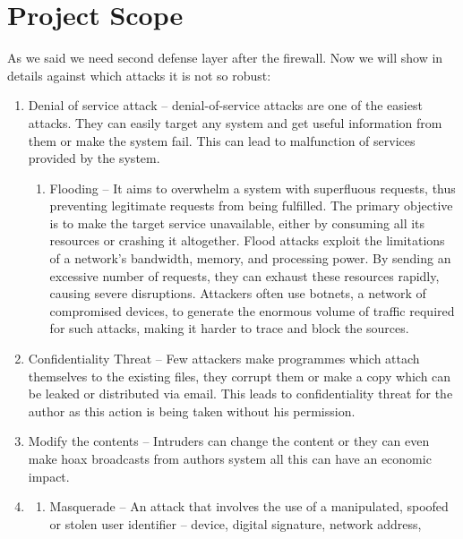\documentclass[oneside, english]{reports/assets/sdqtechreport}
\begin{document}
\chapter{Project Scope}
\label{chap:ProjectScope}

As we said we need second defense layer after the firewall. Now we will show in
details against which attacks it is not so robust:

\begin{enumerate}
	\item Denial of service attack – denial-of-service attacks are one of the easiest
	      attacks. They can easily target any system and get useful information from them
	      or make the system fail. This can lead to malfunction of services provided by
	      the system.
	      \begin{enumerate}
		      \item Flooding – It aims to overwhelm a system with superfluous requests, thus
		            preventing legitimate requests from being fulfilled. The primary objective is
		            to make the target service unavailable, either by consuming all its resources
		            or crashing it altogether. Flood attacks exploit the limitations of a network’s
		            bandwidth, memory, and processing power. By sending an excessive number of
		            requests, they can exhaust these resources rapidly, causing severe disruptions.
		            Attackers often use botnets, a network of compromised devices, to generate the
		            enormous volume of traffic required for such attacks, making it harder to trace
		            and block the sources.
	      \end{enumerate}
	\item Confidentiality Threat – Few attackers make programmes which attach themselves
	      to the existing files, they corrupt them or make a copy which can be leaked or
	      distributed via email. This leads to confidentiality threat for the author as
	      this action is being taken without his permission.
	\item Modify the contents – Intruders can change the content or they can even make
	      hoax broadcasts from authors system all this can have an economic impact. \item
	      \begin{enumerate}
		      \item Masquerade – An attack that involves the use of a manipulated, spoofed or
		            stolen user identifier – device, digital signature, network address,

\end{enumerate}
\end{enumerate}
\end{document}
